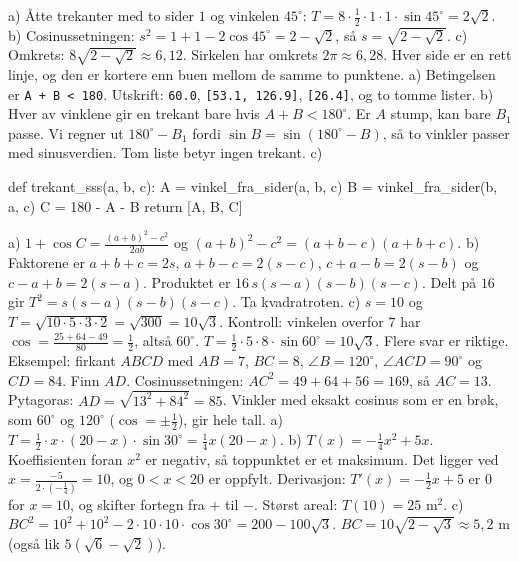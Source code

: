  a) Åtte trekanter med to sider $1$ og vinkelen $45^\circ$: $T = 8 \cdot \frac12 \cdot 1 \cdot 1 \cdot \sin 45^\circ = 2\sqrt2$.
b) Cosinussetningen: $s^2 = 1 + 1 - 2\cos 45^\circ = 2 - \sqrt2$, så $s = \sqrt{2 - \sqrt2}$.
c) Omkrets: $8\sqrt{2 - \sqrt2} \approx 6,12$. Sirkelen har omkrets $2\pi \approx 6,28$. Hver side er en rett linje, og den er kortere enn buen mellom de samme to punktene.
 a) Betingelsen er \lstinline[style=laereverk,numbers=none,frame=none]|A + B < 180|. Utskrift: \lstinline[style=laereverk,numbers=none,frame=none]|60.0|, \lstinline[style=laereverk,numbers=none,frame=none]|[53.1, 126.9]|, \lstinline[style=laereverk,numbers=none,frame=none]|[26.4]|, og to tomme lister.
b) Hver av vinklene gir en trekant bare hvis $A + B < 180^\circ$. Er $A$ stump, kan bare $B_1$ passe. Vi regner ut $180^\circ - B_1$ fordi $\sin B = \sin(180^\circ - B)$, så to vinkler passer med sinusverdien. Tom liste betyr ingen trekant.
c)
\begin{minipage}{\linewidth}
\begin{kode}
def trekant_sss(a, b, c):
    A = vinkel_fra_sider(a, b, c)
    B = vinkel_fra_sider(b, a, c)
    C = 180 - A - B
    return [A, B, C]
\end{kode}
\end{minipage}
 a) $1 + \cos C = \frac{(a+b)^2 - c^2}{2ab}$ og $(a+b)^2 - c^2 = (a+b-c)(a+b+c)$.
b) Faktorene er $a+b+c = 2s$, $a+b-c = 2(s-c)$, $c+a-b = 2(s-b)$ og $c-a+b = 2(s-a)$. Produktet er $16\,s(s-a)(s-b)(s-c)$. Delt på $16$ gir $T^2 = s(s-a)(s-b)(s-c)$. Ta kvadratroten.
c) $s = 10$ og $T = \sqrt{10 \cdot 5 \cdot 3 \cdot 2} = \sqrt{300} = 10\sqrt3$. Kontroll: vinkelen overfor $7$ har $\cos = \frac{25 + 64 - 49}{80} = \frac12$, altså $60^\circ$. $T = \frac12 \cdot 5 \cdot 8 \cdot \sin 60^\circ = 10\sqrt3$.
 Flere svar er riktige. Eksempel: firkant $ABCD$ med $AB = 7$, $BC = 8$, $\angle B = 120^\circ$, $\angle ACD = 90^\circ$ og $CD = 84$. Finn $AD$. Cosinussetningen: $AC^2 = 49 + 64 + 56 = 169$, så $AC = 13$. Pytagoras: $AD = \sqrt{13^2 + 84^2} = 85$.
Vinkler med eksakt cosinus som er en brøk, som $60^\circ$ og $120^\circ$ ($\cos = \pm\frac12$), gir hele tall.
 a) $T = \frac12 \cdot x \cdot (20 - x) \cdot \sin 30^\circ = \frac14 x(20 - x)$.
b) $T(x) = -\frac14 x^2 + 5x$. Koeffisienten foran $x^2$ er negativ, så toppunktet er et maksimum. Det ligger ved $x = \frac{-5}{2 \cdot (-\frac14)} = 10$, og $0 < x < 20$ er oppfylt. Derivasjon: $T'(x) = -\frac12 x + 5$ er $0$ for $x = 10$, og skifter fortegn fra $+$ til $-$. Størst areal: $T(10) = 25$ m$^2$.
c) $BC^2 = 10^2 + 10^2 - 2 \cdot 10 \cdot 10 \cdot \cos 30^\circ = 200 - 100\sqrt3$. $BC = 10\sqrt{2 - \sqrt3} \approx 5,2$ m (også lik $5(\sqrt6 - \sqrt2)$).
